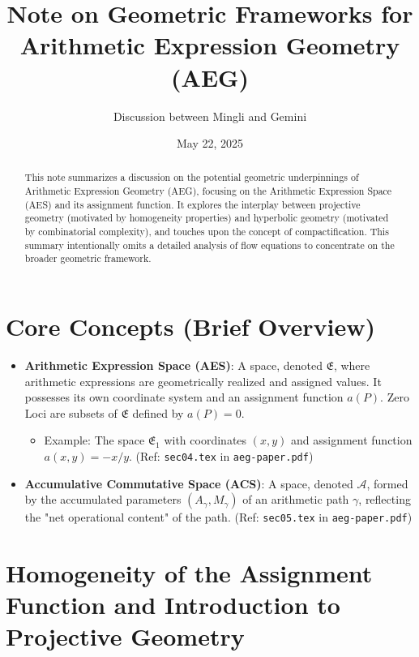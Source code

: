 \documentclass{article}
\title{Note on Geometric Frameworks for Arithmetic Expression Geometry (AEG)}
\author{Discussion between Mingli and Gemini}
\date{May 22, 2025}
\begin{document}
\maketitle
\begin{abstract}
This note summarizes a discussion on the potential geometric underpinnings of Arithmetic Expression Geometry (AEG), focusing on the Arithmetic Expression Space (AES) and its assignment function. It explores the interplay between projective geometry (motivated by homogeneity properties) and hyperbolic geometry (motivated by combinatorial complexity), and touches upon the concept of compactification. This summary intentionally omits a detailed analysis of flow equations to concentrate on the broader geometric framework.
\end{abstract}

\section{Core Concepts (Brief Overview)}

\begin{itemize}
    \item \textbf{Arithmetic Expression Space (AES)}: A space, denoted $\mathfrak{E}$, where arithmetic expressions are geometrically realized and assigned values. It possesses its own coordinate system and an assignment function $a(P)$. Zero Loci are subsets of $\mathfrak{E}$ defined by $a(P)=0$.
    \begin{itemize}
        \item Example: The space $\mathfrak{E}_1$ with coordinates $(x,y)$ and assignment function $a(x,y) = -x/y$. (Ref: \texttt{sec04.tex} in \texttt{aeg-paper.pdf})
    \end{itemize}
    \item \textbf{Accumulative Commutative Space (ACS)}: A space, denoted $\mathcal{A}$, formed by the accumulated parameters $(A_\gamma, M_\gamma)$ of an arithmetic path $\gamma$, reflecting the "net operational content" of the path. (Ref: \texttt{sec05.tex} in \texttt{aeg-paper.pdf})
\end{itemize}

\section{Homogeneity of the Assignment Function and Introduction to Projective Geometry}
\end{document}
